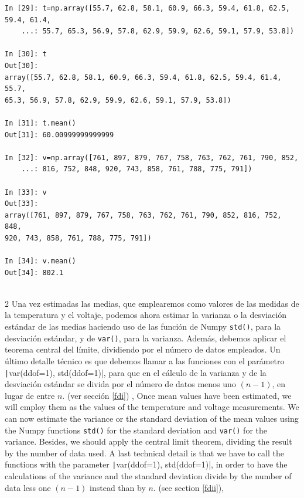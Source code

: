\begin{center}
	\begin{minipage}{\textwidth}
		\begin{verbatim}
In [29]: t=np.array([55.7, 62.8, 58.1, 60.9, 66.3, 59.4, 61.8, 62.5, 59.4, 61.4,
    ...: 55.7, 65.3, 56.9, 57.8, 62.9, 59.9, 62.6, 59.1, 57.9, 53.8])

In [30]: t
Out[30]: 
array([55.7, 62.8, 58.1, 60.9, 66.3, 59.4, 61.8, 62.5, 59.4, 61.4, 55.7,
65.3, 56.9, 57.8, 62.9, 59.9, 62.6, 59.1, 57.9, 53.8])

In [31]: t.mean()
Out[31]: 60.00999999999999
			
In [32]: v=np.array([761, 897, 879, 767, 758, 763, 762, 761, 790, 852,
    ...: 816, 752, 848, 920, 743, 858, 761, 788, 775, 791])
			
In [33]: v
Out[33]: 
array([761, 897, 879, 767, 758, 763, 762, 761, 790, 852, 816, 752, 848,
920, 743, 858, 761, 788, 775, 791])
			
In [34]: v.mean()
Out[34]: 802.1
					
		\end{verbatim}
	\end{minipage}
\end{center}

\begin{paracol}{2}
Una vez estimadas las medias, que emplearemos como valores de las medidas de la temperatura y el voltaje,  podemos ahora estimar la varianza o la desviación estándar de las medias haciendo uso de las función de Numpy \texttt{std()}, para la desviación estándar,  y de \texttt{var()}, para la varianza.  Además, debemos aplicar el teorema central del límite, dividiendo por el número de datos empleados. Un último detalle técnico es que debemos llamar a las funciones con el parámetro \texttt|var(ddof=1), std(ddof=1)|, para que en el cálculo de la varianza y de la desviación estándar se divida por el número de datos menos uno $(n-1)$, en lugar de entre $n$. (ver sección \ref{fdi}) , 
\switchcolumn
Once mean values have been estimated, we will employ them as the values of the temperature and voltage measurements. We can now estimate the variance or the standard deviation of the mean values using the Numpy functions \texttt{std()} for the standard deviation and \texttt{var()} for the variance. Besides, we should apply the central limit theorem, dividing the result by the number of data used. A last technical detail is that we have to call the functions with the parameter \texttt|var(ddof=1), std(ddof=1)|, in order to have the calculations of the variance and the standard deviation divide by the number of data less one $(n-1)$ instead than by $n$. (see section \ref{fdii}),    
\end{paracol}


